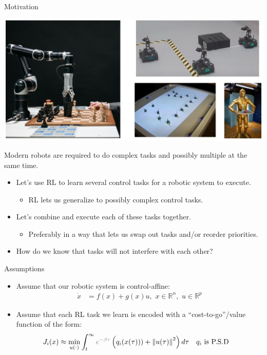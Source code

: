 \begin{frame}{Motivation}
	\begin{minipage}{\textwidth}
		\centering		
		\includegraphics[width=0.85\linewidth]{motivationsCombined}
	\end{minipage}%
	\seprule
	Modern robots are required to do complex tasks and possibly multiple at the same time.
\end{frame}

\begin{frame}
	\begin{itemize}
		\item{Let's use RL to learn several control tasks for a robotic system to execute.}
			\begin{itemize}
				\item{ RL lets us generalize to possibly complex control tasks.}
			\end{itemize}
		\item{Let's combine and execute each of these tasks together.}
			\begin{itemize}
				\item{Preferably in a way that lets us swap out tasks and/or reorder priorities.}
			\end{itemize}
		\item{ { \color{red} How do we know that tasks will not interfere with each other? } }
	\end{itemize}
\end{frame}

\begin{frame}{Assumptions}
	\begin{itemize}
		\item{Assume that our robotic system is control-affine:
	\begin{align*}
		\dot{x} &= f(x) + g(x)u, \,\, x \in \mathbb{R}^n, \,\, u \in \mathbb{R}^p
	\end{align*}}
		\item{Assume that each RL task we learn is encoded with a ``cost-to-go''/value function of the form:
	\begin{align*}
		J_i (x) &\approx \min_{u(\cdot)} \int_t^{\infty} { \color{gray} e^{- \beta \tau} } \left( q_i(x(\tau))) + {\lVert u(\tau) \rVert}^2 \right) d \tau && \text{$q_i$ is P.S.D}
	\end{align*}}
	\end{itemize}
\end{frame}

